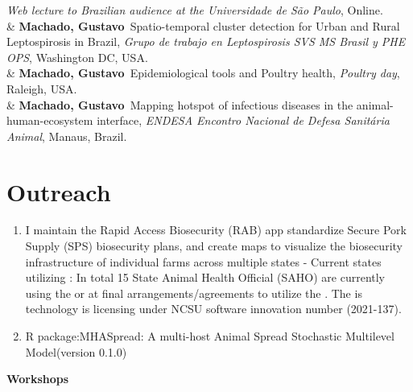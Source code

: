 \documentclass[11pt]{article}
\newcommand{\FirstName}{Gustavo}
\newcommand{\LastName}{Machado}
\newcommand{\Initials}{}
\newcommand{\Me}{\textbf{\LastName, \FirstName \Initials }}
\newcommand{\Year}[1]{\fontsize{10pt}{0}\selectfont #1}
\begin{document}
\begin{EntriesTable}
  \emph{Web lecture to Brazilian audience at the Universidade de São Paulo},
  Online.
  \\
\Year{2018}  &
  \Me\
 Spatio-temporal cluster detection for Urban and Rural Leptospirosis in Brazil,
  \emph{Grupo de trabajo en Leptospirosis SVS MS Brasil y PHE OPS},
  Washington DC, USA.
  \\
\Year{2018}  &
  \Me\
  Epidemiological tools and Poultry health,
  \emph{Poultry day},
  Raleigh, USA.
  \\
\Year{2017}  &
  \Me\
  Mapping hotspot of infectious diseases in the animal-human-ecosystem interface,
  \emph{ENDESA Encontro Nacional de Defesa Sanitária Animal},
  Manaus, Brazil.
\end{EntriesTable}


\section{Outreach}

\begin{enumerate}
    \item I maintain the Rapid Access Biosecurity (RAB) app standardize Secure Pork Supply (SPS) biosecurity plans, and create maps to visualize the biosecurity infrastructure of individual farms across multiple states
- Current states utilizing \href{https://machado-lab.github.io/rabapp/} {}: In total 15 State Animal Health Official (SAHO) are currently using the \href{https://machado-lab.github.io/rabapp/} {} or at final arrangements/agreements to utilize the
{} . The {}  is technology is licensing under NCSU software innovation number (2021-137).

\hspace{0.5 cm }

\item R package:MHASpread: A multi-host Animal Spread Stochastic Multilevel Model(version 0.1.0)
\end{enumerate}

\hspace{0.5 cm }

\textbf{Workshops}
\end{document}
